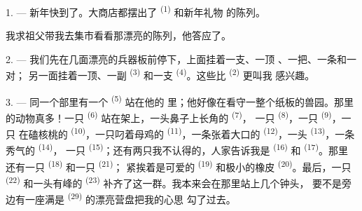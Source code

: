 %

\VUsaut{4.0mm}
\VUsaut{2.0mm}
\VUsaut{3.4mm}

1. --- 新年快到了。大商店都摆出了 \textsuperscript{(1)} 和新年礼物
的陈列。

我求祖父带我去集市看看那漂亮的陈列，他答应了。

2. --- 我们先在几面漂亮的兵器板前停下，上面挂着一支、一顶
、一把、一条和一对；
另一面挂着一顶、一副 \textsuperscript{(3)} 和一支
 \textsuperscript{(4)}。这些比 \textsuperscript{(2)} 更叫我
感兴趣。

\VUsaut{3.0mm}
\VUsaut{2.6mm}

3. --- 同一个部里有一个 \textsuperscript{(5)} 站在他的
里；他好像在看守一整个纸板的兽园。那里的动物真多！一只
\textsuperscript{(6)} 站在架上，一头鼻子上长角的 \textsuperscript{(7)}，
一只 \textsuperscript{(8)}，一只 \textsuperscript{(9)}，一只
在磕核桃的 \textsuperscript{(10)}，一只叼着母鸡的
\textsuperscript{(11)}，一条张着大口的 \textsuperscript{(12)}，一头
 \textsuperscript{(13)}，一条秀气的 \textsuperscript{(14)}，
一只 \textsuperscript{(15)}；还有两只我不认得的，人家告诉我是
 \textsuperscript{(16)} 和 \textsuperscript{(17)}。那里
还有一只 \textsuperscript{(18)} 和一只 \textsuperscript{(21)}；
紧挨着是可爱的 \textsuperscript{(19)} 和极小的橡皮
\textsuperscript{(20)}。最后，一只 \textsuperscript{(22)} 和一头有峰的
 \textsuperscript{(23)} 补齐了这一群。我本来会在那里站上几个钟头，
要不是旁边有一座满是 \textsuperscript{(29)} 的漂亮营盘把我的心思
勾了过去。

